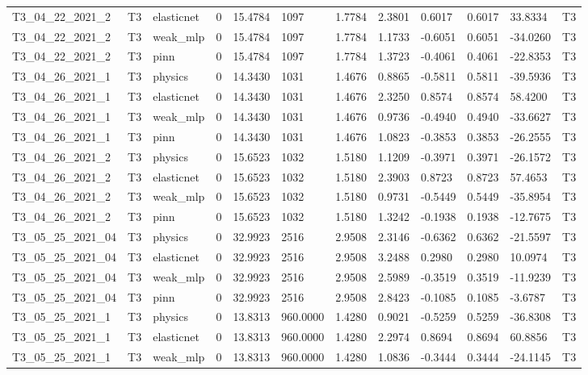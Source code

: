 \begin{table}[t]
\begin{tabular}{llllllllllll}
T3\_04\_22\_2021\_2 & T3 & elasticnet & 0 & 15.4784 & 1097 & 1.7784 & 2.3801 & 0.6017 & 0.6017 & 33.8334 & T3 \\
T3\_04\_22\_2021\_2 & T3 & weak\_mlp & 0 & 15.4784 & 1097 & 1.7784 & 1.1733 & -0.6051 & 0.6051 & -34.0260 & T3 \\
T3\_04\_22\_2021\_2 & T3 & pinn & 0 & 15.4784 & 1097 & 1.7784 & 1.3723 & -0.4061 & 0.4061 & -22.8353 & T3 \\
T3\_04\_26\_2021\_1 & T3 & physics & 0 & 14.3430 & 1031 & 1.4676 & 0.8865 & -0.5811 & 0.5811 & -39.5936 & T3 \\
T3\_04\_26\_2021\_1 & T3 & elasticnet & 0 & 14.3430 & 1031 & 1.4676 & 2.3250 & 0.8574 & 0.8574 & 58.4200 & T3 \\
T3\_04\_26\_2021\_1 & T3 & weak\_mlp & 0 & 14.3430 & 1031 & 1.4676 & 0.9736 & -0.4940 & 0.4940 & -33.6627 & T3 \\
T3\_04\_26\_2021\_1 & T3 & pinn & 0 & 14.3430 & 1031 & 1.4676 & 1.0823 & -0.3853 & 0.3853 & -26.2555 & T3 \\
T3\_04\_26\_2021\_2 & T3 & physics & 0 & 15.6523 & 1032 & 1.5180 & 1.1209 & -0.3971 & 0.3971 & -26.1572 & T3 \\
T3\_04\_26\_2021\_2 & T3 & elasticnet & 0 & 15.6523 & 1032 & 1.5180 & 2.3903 & 0.8723 & 0.8723 & 57.4653 & T3 \\
T3\_04\_26\_2021\_2 & T3 & weak\_mlp & 0 & 15.6523 & 1032 & 1.5180 & 0.9731 & -0.5449 & 0.5449 & -35.8954 & T3 \\
T3\_04\_26\_2021\_2 & T3 & pinn & 0 & 15.6523 & 1032 & 1.5180 & 1.3242 & -0.1938 & 0.1938 & -12.7675 & T3 \\
T3\_05\_25\_2021\_04 & T3 & physics & 0 & 32.9923 & 2516 & 2.9508 & 2.3146 & -0.6362 & 0.6362 & -21.5597 & T3 \\
T3\_05\_25\_2021\_04 & T3 & elasticnet & 0 & 32.9923 & 2516 & 2.9508 & 3.2488 & 0.2980 & 0.2980 & 10.0974 & T3 \\
T3\_05\_25\_2021\_04 & T3 & weak\_mlp & 0 & 32.9923 & 2516 & 2.9508 & 2.5989 & -0.3519 & 0.3519 & -11.9239 & T3 \\
T3\_05\_25\_2021\_04 & T3 & pinn & 0 & 32.9923 & 2516 & 2.9508 & 2.8423 & -0.1085 & 0.1085 & -3.6787 & T3 \\
T3\_05\_25\_2021\_1 & T3 & physics & 0 & 13.8313 & 960.0000 & 1.4280 & 0.9021 & -0.5259 & 0.5259 & -36.8308 & T3 \\
T3\_05\_25\_2021\_1 & T3 & elasticnet & 0 & 13.8313 & 960.0000 & 1.4280 & 2.2974 & 0.8694 & 0.8694 & 60.8856 & T3 \\
T3\_05\_25\_2021\_1 & T3 & weak\_mlp & 0 & 13.8313 & 960.0000 & 1.4280 & 1.0836 & -0.3444 & 0.3444 & -24.1145 & T3 \\

\end{tabular}
\end{table}
